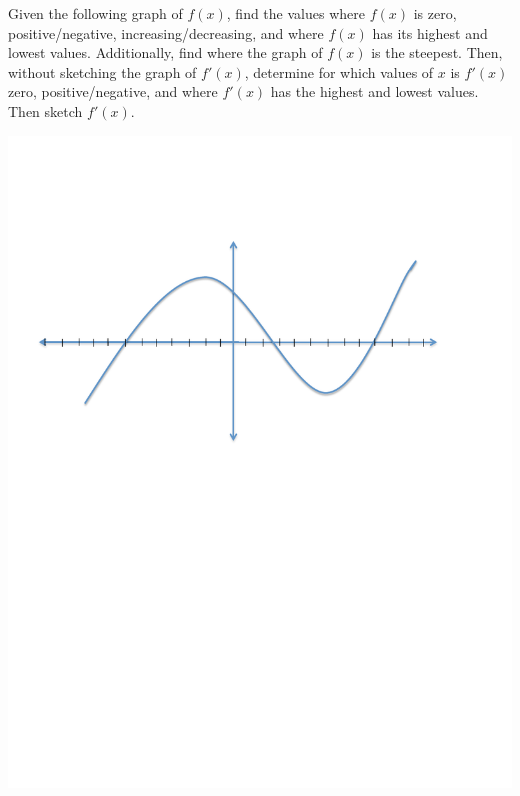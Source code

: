 \documentclass[handout,nooutcomes]{ximera}
\begin{document}
	
	
	
			
			

\begin{problem}
Given the following graph of $f(x)$, find the values where $f(x)$ is zero, positive/negative, increasing/decreasing, and where $f(x)$ has its highest and lowest values.  Additionally, find where the graph of $f(x)$ is the steepest. Then, without sketching the graph of $f'(x)$, determine for which values of $x$ is $f'(x)$ zero, positive/negative, and where $f'(x)$ has the highest and lowest values.  Then sketch $f'(x)$.
	\begin{image}
	\includegraphics[trim= 170 410 250 100]{Figure2.pdf}
	\end{image}


\end{problem}
\end{document}
